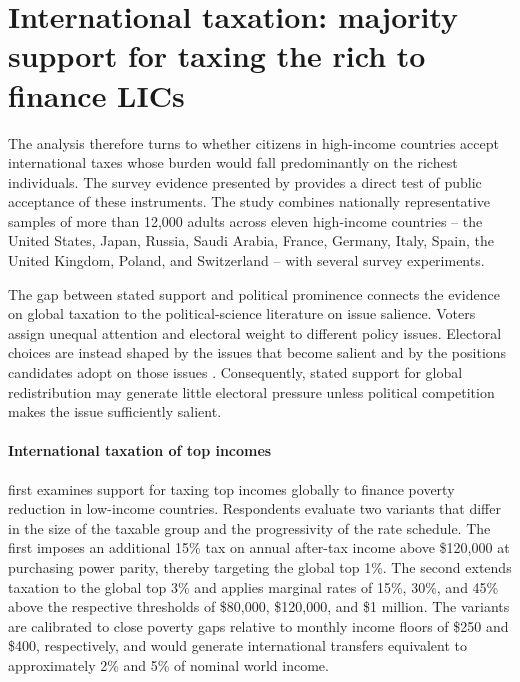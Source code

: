 \documentclass[11pt,a4paper]{article}
\begin{document}
\section{International taxation: majority support for taxing the rich to finance LICs}

The analysis therefore turns to whether citizens in high-income countries accept %
international taxes whose burden would fall predominantly on the richest individuals. %
The survey evidence presented by \citet{fabre_public_2026} provides a direct test of public acceptance of these instruments. The study combines nationally representative samples of more than 12,000 adults across eleven high-income countries -- the United States, Japan, Russia, Saudi Arabia, France, Germany, Italy, Spain, the United Kingdom, Poland, and Switzerland -- with several survey experiments. %

The gap between stated support and political prominence connects the evidence on global taxation to the political-science literature on issue salience. Voters assign unequal attention and electoral weight to different policy issues. Electoral choices are instead shaped by the issues that become salient and by the positions candidates adopt on those issues \citep{repass_issue_1971,krosnick_role_1988,edwards_explaining_1995,dennison_review_2019}. Consequently, stated support for global redistribution may generate little electoral pressure unless political competition makes the issue sufficiently salient.

\paragraph{International taxation of top incomes}
\citet{fabre_public_2026} first examines support for taxing top incomes globally to finance poverty reduction in low-income countries. Respondents evaluate %
two variants that differ in the size of the taxable group and the progressivity of the rate schedule. The first imposes an additional 15\% tax on annual after-tax income above \$120,000 at purchasing power parity, thereby targeting the global top 1\%. The second extends taxation to the global top 3\% and applies marginal rates of 15\%, 30\%, and 45\% above the respective thresholds of \$80,000, \$120,000, and \$1 million. The variants are calibrated to close poverty gaps relative to monthly income floors of \$250 and \$400, respectively, and would generate international transfers equivalent to approximately 2\% and 5\% of nominal world income.
\end{document}
